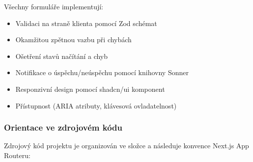 \documentclass[12pt, a4paper]{article}
\begin{document}
Všechny formuláře implementují:
\begin{itemize}
    \item Validaci na straně klienta pomocí Zod schémat
    \item Okamžitou zpětnou vazbu při chybách
    \item Ošetření stavů načítání a chyb
    \item Notifikace o úspěchu/neúspěchu pomocí knihovny Sonner
    \item Responzivní design pomocí shadcn/ui komponent
    \item Přístupnost (ARIA atributy, klávesová ovladatelnost)
\end{itemize}

\subsubsection{Orientace ve zdrojovém kódu}
\label{subsubsec:orientace_kod}

Zdrojový kód projektu je organizován ve složce  a následuje konvence Next.js App Routeru:
\end{document}
